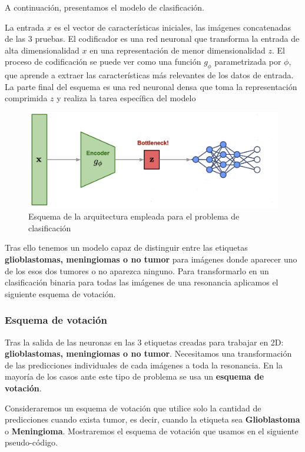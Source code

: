 A continuación, presentamos el modelo de clasificación.

La entrada $x$ es el vector de características iniciales, las imágenes concatenadas de las $3$ pruebas. El codificador es una red neuronal que transforma la entrada de alta dimensionalidad $x$ en una representación de menor dimensionalidad $z$. El proceso de codificación se puede ver como una función $g_{\phi}$ parametrizada por $\phi$, que aprende a extraer las características más relevantes de los datos de entrada. La parte final del esquema es una red neuronal densa que toma la representación comprimida $z$ y realiza la tarea específica del modelo

\begin{figure}[H]
	\centering
	\includegraphics[width=0.9\linewidth]{imagenes/esquema_clasificacion.png}
	\caption{Esquema de la arquitectura empleada para el problema de clasificación}
\end{figure}

Tras ello tenemos un modelo capaz de distinguir entre las etiquetas \textbf{glioblastomas, meningiomas o no tumor} para imágenes donde aparecer uno de los esos dos tumores o no aparezca ninguno. Para transformarlo en un clasificación binaria para todas las imágenes de una resonancia aplicamos el siguiente esquema de votación.

\subsubsection{Esquema de votación}

Tras la salida de las neuronas en las $3$ etiquetas creadas para trabajar en 2D: \textbf{glioblastomas, meningiomas o no tumor}. Necesitamos una transformación de las predicciones individuales de cada imágenes a toda la resonancia. En la mayoría de los casos ante este tipo de problema se usa un \textbf{esquema de votación}.

Consideraremos un esquema de votación que utilice solo la cantidad de predicciones cuando exista tumor, es decir, cuando la etiqueta sea \textbf{Glioblastoma} o \textbf{Meningioma}. Mostraremos el esquema de votación que usamos en el siguiente pseudo-código.

